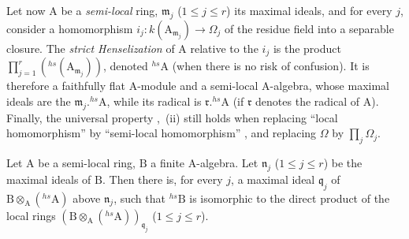 \begin{env}[18.8.9]
\label{IV.18.8.9}
Let now A be a \emph{semi-local} ring, $\mathfrak{m}_j$ ($1\leq j\leq r$) its maximal ideals, and for every $j$, consider a homomorphism $i_j:k(\mathrm{A}_{\mathfrak{m}_j})\to\Omega_j$ of the residue field into a separable closure.
The \emph{strict Henselization} of A relative to the $i_j$ is the product $\prod_{j=1}^{r}({}^{hs}(\mathrm{A}_{\mathfrak{m}_j}))$, denoted ${}^{hs}\!\mathrm{A}$ (when there is no risk of confusion).
It is therefore a faithfully flat A-module and a semi-local A-algebra, whose maximal ideals are the $\mathfrak{m}_j.{}^{hs}\!\mathrm{A}$, while its radical is $\mathfrak{r}.{}^{hs}\!\mathrm{A}$ (if $\mathfrak{r}$ denotes the radical of A).
Finally, the universal property ,~(ii) still holds when replacing ``local homomorphism'' by ``semi-local homomorphism'' , and replacing $\Omega$ by $\prod_j\Omega_j$.
\end{env}

\begin{proposition}[18.8.10]
\label{IV.18.8.10}
Let $\mathrm{A}$ be a semi-local ring, $\mathrm{B}$ a finite A-algebra.
Let $\mathfrak{n}_j$ ($1\leq j\leq r$) be the maximal ideals of $\mathrm{B}$.
Then there is, for every $j$, a maximal ideal $\mathfrak{q}_j$ of $\mathrm{B}\otimes_{\mathrm{A}}({}^{hs}\!\mathrm{A})$ above $\mathfrak{n}_j$, such that ${}^{hs}\!\mathrm{B}$ is isomorphic to the direct product of the local rings $(\mathrm{B}\otimes_{\mathrm{A}}({}^{hs}\!\mathrm{A}))_{\mathfrak{q}_j}$ ($1\leq j\leq r$).
\end{proposition}


